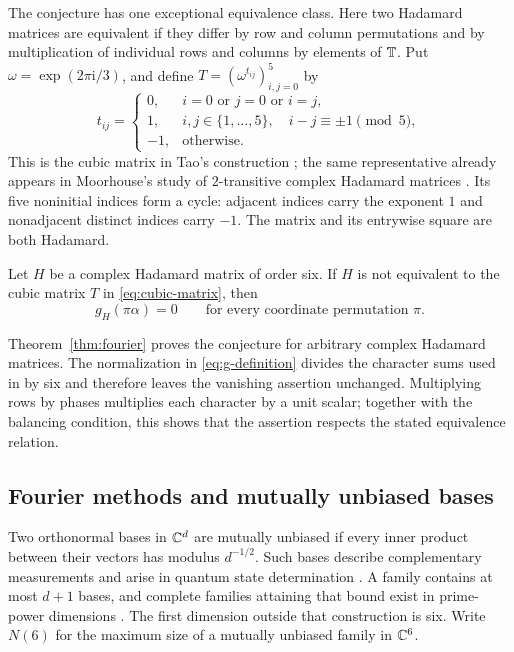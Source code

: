 \documentclass[11pt]{article}
\begin{document}
The conjecture has one exceptional equivalence class. Here two Hadamard
matrices are equivalent if they differ by row and column permutations
and by multiplication of individual rows and columns by elements of
$\mathbb T$. Put $\omega=\exp(2\pi\mathrm i/3)$, and define
$T=(\omega^{t_{ij}})_{i,j=0}^5$ by
\begin{equation}\label{eq:cubic-matrix}
 t_{ij}=\begin{cases}
 0,&i=0\text{ or }j=0\text{ or }i=j,\\
 1,&i,j\in\{1,\ldots,5\},\quad i-j\equiv\pm1\pmod5,\\
 -1,&\text{otherwise}.
 \end{cases}
\end{equation}
This is the cubic matrix in Tao's construction
\cite[p.~254]{Tao2004}; the same representative already appears in
Moorhouse's study of $2$-transitive complex Hadamard matrices
\cite[Example~1.1]{Moorhouse2001}. Its five noninitial indices form a cycle: adjacent
indices carry the exponent $1$ and nonadjacent distinct indices carry
$-1$. The matrix and its entrywise square are both Hadamard.

\begin{theorem}\label{thm:fourier}
Let $H$ be a complex Hadamard matrix of order six. If $H$ is not equivalent
to the cubic matrix $T$ in \eqref{eq:cubic-matrix}, then
\[
 g_H(\pi\alpha)=0\qquad\text{for every coordinate permutation }\pi.
\]
\end{theorem}

Theorem~\ref{thm:fourier} proves the conjecture for arbitrary complex
Hadamard matrices. The normalization in \eqref{eq:g-definition} divides
the character sums used in \cite{MatolcsiRuzsaWeiner2013} by six and
therefore leaves the vanishing assertion unchanged. Multiplying rows by
phases multiplies each character by a unit scalar; together with the
balancing condition, this shows that the assertion respects the stated
equivalence relation.

\subsection{Fourier methods and mutually unbiased bases}

Two orthonormal bases in $\mathbb C^d$ are mutually unbiased if every inner
product between their vectors has modulus $d^{-1/2}$. Such bases describe
complementary measurements and arise in quantum state determination
\cite{Ivanovic1981,WoottersFields1989}. A family contains at most $d+1$
bases, and complete families attaining that bound exist in prime-power
dimensions \cite{WoottersFields1989}. The first dimension outside that
construction is six. Write $N(6)$ for the maximum size of a mutually
unbiased family in $\mathbb C^6$.
\end{document}
